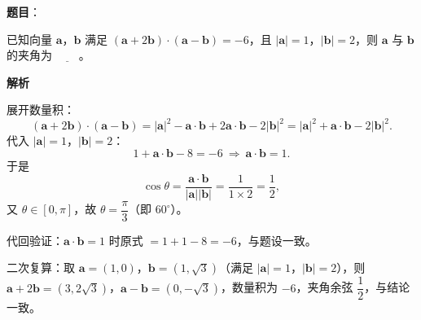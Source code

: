 \begin{answer}

\textbf{题目}：

已知向量 $\boldsymbol a$，$\boldsymbol b$ 满足 $(\boldsymbol a+2\boldsymbol b)\cdot(\boldsymbol a-\boldsymbol b)=-6$，且 $|\boldsymbol a|=1$，$|\boldsymbol b|=2$，则 $\boldsymbol a$ 与 $\boldsymbol b$ 的夹角为 $\underline{\qquad}$。

\textbf{解析}

展开数量积：
\nopagebreak[4]
\[(\boldsymbol a+2\boldsymbol b)\cdot(\boldsymbol a-\boldsymbol b)=|\boldsymbol a|^2-\boldsymbol a\cdot\boldsymbol b+2\boldsymbol a\cdot\boldsymbol b-2|\boldsymbol b|^2=|\boldsymbol a|^2+\boldsymbol a\cdot\boldsymbol b-2|\boldsymbol b|^2.\]
代入 $|\boldsymbol a|=1$，$|\boldsymbol b|=2$：
\nopagebreak[4]
\[1+\boldsymbol a\cdot\boldsymbol b-8=-6\ \Longrightarrow\ \boldsymbol a\cdot\boldsymbol b=1.\]
于是
\nopagebreak[4]
\[\cos\theta=\frac{\boldsymbol a\cdot\boldsymbol b}{|\boldsymbol a||\boldsymbol b|}=\frac{1}{1\times2}=\frac12,\]
又 $\theta\in[0,\pi]$，故 $\theta=\dfrac{\pi}{3}$（即 $60^\circ$）。

代回验证：$\boldsymbol a\cdot\boldsymbol b=1$ 时原式 $=1+1-8=-6$，与题设一致。

二次复算：取 $\boldsymbol a=(1,0)$，$\boldsymbol b=(1,\sqrt3)$（满足 $|\boldsymbol a|=1$，$|\boldsymbol b|=2$），则 $\boldsymbol a+2\boldsymbol b=(3,2\sqrt3)$，$\boldsymbol a-\boldsymbol b=(0,-\sqrt3)$，数量积为 $-6$，夹角余弦 $\dfrac{1}{2}$，与结论一致。


\end{answer}

